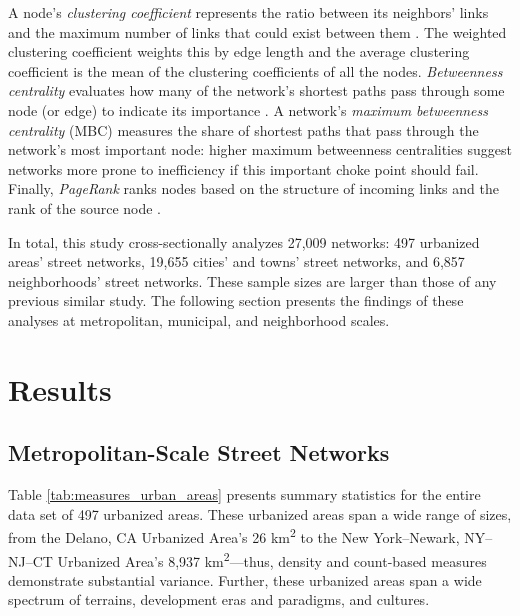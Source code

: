 \documentclass[Afour,sageh,times]{sagej}
\renewcommand{\cite}{\citep}
\begin{document}
A node's \emph{clustering coefficient} represents the ratio between its neighbors' links and the maximum number of links that could exist between them \cite{jiang_topological_2004, opsahl_clustering_2009}. The weighted clustering coefficient weights this by edge length and the average clustering coefficient is the mean of the clustering coefficients of all the nodes. \emph{Betweenness centrality} evaluates how many of the network's shortest paths pass through some node (or edge) to indicate its importance \cite{barthelemy_betweenness_2004,huang_trajgraph:_2016, zhong_revealing_2017}. A network's \emph{maximum betweenness centrality} (MBC) measures the share of shortest paths that pass through the network's most important node: higher maximum betweenness centralities suggest networks more prone to inefficiency if this important choke point should fail. Finally, \emph{PageRank} ranks nodes based on the structure of incoming links and the rank of the source node \cite{brin_anatomy_1998, jiang_predicting_2008, agryzkov_algorithm_2012, chin_geographically_2015, gleich_pagerank_2015}.

In total, this study cross-sectionally analyzes 27,009 networks: 497 urbanized areas' street networks, 19,655 cities' and towns' street networks, and 6,857 neighborhoods' street networks. These sample sizes are larger than those of any previous similar study. The following section presents the findings of these analyses at metropolitan, municipal, and neighborhood scales.


\section{Results}

\subsection{Metropolitan-Scale Street Networks}

Table \ref{tab:measures_urban_areas} presents summary statistics for the entire data set of 497 urbanized areas. These urbanized areas span a wide range of sizes, from the Delano, CA Urbanized Area's 26 km\textsuperscript{2} to the New York--Newark, NY--NJ--CT Urbanized Area's 8,937 km\textsuperscript{2}---thus, density and count-based measures demonstrate substantial variance. Further, these urbanized areas span a wide spectrum of terrains, development eras and paradigms, and cultures.
\end{document}
